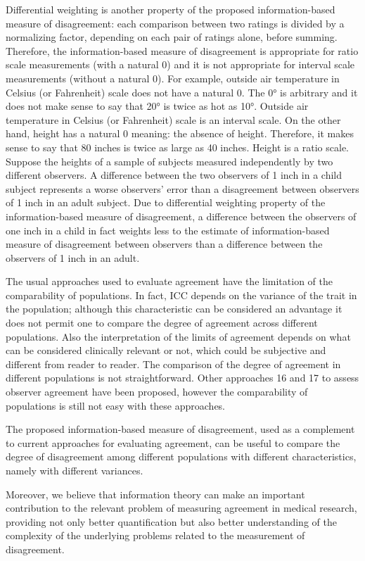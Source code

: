 \documentclass[Chap3bmain.tex]{subfiles}
\begin{document}
Differential weighting is another property of the proposed information-based measure of disagreement: each comparison between two ratings is divided by a normalizing factor, depending on each pair of ratings alone, before summing. Therefore, the information-based measure of disagreement is appropriate for ratio scale measurements (with a natural 0) and it is not appropriate for interval scale measurements (without a natural 0). For example, outside air temperature in Celsius (or Fahrenheit) scale does not have a natural 0. The 0° is arbitrary and it does not make sense to say that 20° is twice as hot as 10°. Outside air temperature in Celsius (or Fahrenheit) scale is an interval scale. On the other hand, height has a natural 0 meaning: the absence of height. Therefore, it makes sense to say that 80 inches is twice as large as 40 inches. Height is a ratio scale. Suppose the heights of a sample of subjects measured independently by two different observers. A difference between the two observers of 1 inch in a child subject represents a worse observers' error than a disagreement between observers of 1 inch in an adult subject. Due to differential weighting property of the information-based measure of disagreement, a difference between the observers of one inch in a child in fact weights less to the estimate of information-based measure of disagreement between observers than a difference between the observers of 1 inch in an adult.

The usual approaches used to evaluate agreement have the limitation of the comparability of populations. In fact, ICC depends on the variance of the trait in the population; although this characteristic can be considered an advantage it does not permit one to compare the degree of agreement across different populations. Also the interpretation of the limits of agreement depends on what can be considered clinically relevant or not, which could be subjective and different from reader to reader. The comparison of the degree of agreement in different populations is not straightforward. Other approaches 16 and 17 to assess observer agreement have been proposed, however the comparability of populations is still not easy with these approaches.

The proposed information-based measure of disagreement, used as a complement to current approaches for evaluating agreement, can be useful to compare the degree of disagreement among different populations with different characteristics, namely with different variances.

Moreover, we believe that information theory can make an important contribution to the relevant problem of measuring agreement in medical research, providing not only better quantification but also better understanding of the complexity of the underlying problems related to the measurement of disagreement.

\end{document}
